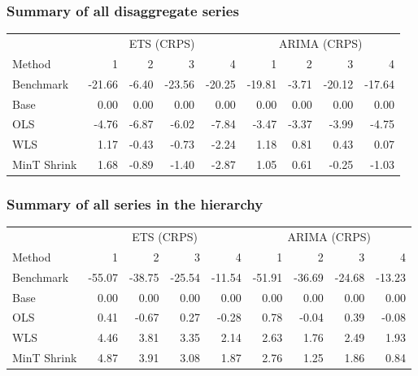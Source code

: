 \documentclass[]{article}
\begin{document}
\subsubsection{Summary of all disaggregate
series}\label{summary-of-all-disaggregate-series-1}

\begin{table}[H]
\centering
\begin{tabular}{l|r|r|r|r|r|r|r|r}
\hline
\multicolumn{1}{c|}{ } & \multicolumn{4}{|c|}{ETS (CRPS)} & \multicolumn{4}{|c}{ARIMA (CRPS)} \\
\cline{2-5} \cline{6-9}
Method & 1 & 2 & 3 & 4 & 1 & 2 & 3 & 4\\
\hline
Benchmark & -21.66 & -6.40 & -23.56 & -20.25 & -19.81 & -3.71 & -20.12 & -17.64\\
\hline
Base & 0.00 & 0.00 & 0.00 & 0.00 & 0.00 & 0.00 & 0.00 & 0.00\\
\hline
OLS & -4.76 & -6.87 & -6.02 & -7.84 & -3.47 & -3.37 & -3.99 & -4.75\\
\hline
WLS & 1.17 & -0.43 & -0.73 & -2.24 & 1.18 & 0.81 & 0.43 & 0.07\\
\hline
MinT Shrink & 1.68 & -0.89 & -1.40 & -2.87 & 1.05 & 0.61 & -0.25 & -1.03\\
\hline
\end{tabular}
\end{table}

\subsubsection{Summary of all series in the
hierarchy}\label{summary-of-all-series-in-the-hierarchy-1}

\begin{table}[H]
\centering
\begin{tabular}{l|r|r|r|r|r|r|r|r}
\hline
\multicolumn{1}{c|}{ } & \multicolumn{4}{|c|}{ETS (CRPS)} & \multicolumn{4}{|c}{ARIMA (CRPS)} \\
\cline{2-5} \cline{6-9}
Method & 1 & 2 & 3 & 4 & 1 & 2 & 3 & 4\\
\hline
Benchmark & -55.07 & -38.75 & -25.54 & -11.54 & -51.91 & -36.69 & -24.68 & -13.23\\
\hline
Base & 0.00 & 0.00 & 0.00 & 0.00 & 0.00 & 0.00 & 0.00 & 0.00\\
\hline
OLS & 0.41 & -0.67 & 0.27 & -0.28 & 0.78 & -0.04 & 0.39 & -0.08\\
\hline
WLS & 4.46 & 3.81 & 3.35 & 2.14 & 2.63 & 1.76 & 2.49 & 1.93\\
\hline
MinT Shrink & 4.87 & 3.91 & 3.08 & 1.87 & 2.76 & 1.25 & 1.86 & 0.84\\
\hline
\end{tabular}
\end{table}
\end{document}
